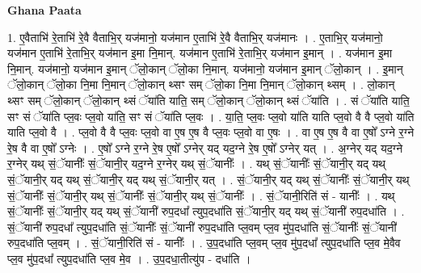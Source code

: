 \documentclass[17pt]{extarticle}
\begin{document}
\textbf{Ghana Paata } \newline

1. ए॒वैताभि॑ रे॒ताभि॑ रे॒वै वैताभि॒र् यज॑मानो॒ यज॑मान ए॒ताभि॑ रे॒वै वैताभि॒र् यज॑मानः । . ए॒ताभि॒र् यज॑मानो॒ यज॑मान ए॒ताभि॑ रे॒ताभि॒र् यज॑मान इ॒मा नि॒मान्. यज॑मान ए॒ताभि॑ रे॒ताभि॒र् यज॑मान इ॒मान् । . यज॑मान इ॒मा नि॒मान्. यज॑मानो॒ यज॑मान इ॒मान् ॅलो॒कान् ॅलो॒का नि॒मान्. यज॑मानो॒ यज॑मान इ॒मान् ॅलो॒कान् । . इ॒मान् ॅलो॒कान् ॅलो॒का नि॒मा नि॒मान् ॅलो॒कान् थ्सꣳ सम् ॅलो॒का नि॒मा नि॒मान् ॅलो॒कान् थ्सम् । . लो॒कान् थ्सꣳ सम् ॅलो॒कान् ॅलो॒कान् थ्सं ॅया॑ति याति॒ सम् ॅलो॒कान् ॅलो॒कान् थ्सं ॅया॑ति । . सं ॅया॑ति याति॒ सꣳ सं ॅया॑ति प्ल॒वः प्ल॒वो या॑ति॒ सꣳ सं ॅया॑ति प्ल॒वः । . या॒ति॒ प्ल॒वः प्ल॒वो या॑ति याति प्ल॒वो वै वै प्ल॒वो या॑ति याति प्ल॒वो वै । . प्ल॒वो वै वै प्ल॒वः प्ल॒वो वा ए॒ष ए॒ष वै प्ल॒वः प्ल॒वो वा ए॒षः । . वा ए॒ष ए॒ष वै वा ए॒षो᳚ ऽग्ने र॒ग्ने रे॒ष वै वा ए॒षो᳚ ऽग्नेः । . ए॒षो᳚ ऽग्ने र॒ग्ने रे॒ष ए॒षो᳚ ऽग्नेर् यद् यद॒ग्ने रे॒ष ए॒षो᳚ ऽग्नेर् यत् । . अ॒ग्नेर् यद् यद॒ग्ने र॒ग्नेर् यथ् सं॒ॅयानीः᳚ सं॒ॅयानी॒र् यद॒ग्ने र॒ग्नेर् यथ् सं॒ॅयानीः᳚ । . यथ् सं॒ॅयानीः᳚ सं॒ॅयानी॒र् यद् यथ् सं॒ॅयानी॒र् यद् यथ् सं॒ॅयानी॒र् यद् यथ् सं॒ॅयानी॒र् यत् । . सं॒ॅयानी॒र् यद् यथ् सं॒ॅयानीः᳚ सं॒ॅयानी॒र् यथ् सं॒ॅयानीः᳚ सं॒ॅयानी॒र् यथ् सं॒ॅयानीः᳚ सं॒ॅयानी॒र् यथ् सं॒ॅयानीः᳚ । . सं॒ॅयानी॒रिति॑ सं - यानीः᳚ । . यथ् सं॒ॅयानीः᳚ सं॒ॅयानी॒र् यद् यथ् सं॒ॅयानी॑ रुप॒दधा᳚ त्युप॒दधा॑ति सं॒ॅयानी॒र् यद् यथ् सं॒ॅयानी॑ रुप॒दधा॑ति । . सं॒ॅयानी॑ रुप॒दधा᳚ त्युप॒दधा॑ति सं॒ॅयानीः᳚ सं॒ॅयानी॑ रुप॒दधा॑ति प्ल॒वम् प्ल॒व मु॑प॒दधा॑ति सं॒ॅयानीः᳚ सं॒ॅयानी॑ रुप॒दधा॑ति प्ल॒वम् । . सं॒ॅयानी॒रिति॑ सं - यानीः᳚ । . उ॒प॒दधा॑ति प्ल॒वम् प्ल॒व मु॑प॒दधा᳚ त्युप॒दधा॑ति प्ल॒व मे॒वैव प्ल॒व मु॑प॒दधा᳚ त्युप॒दधा॑ति प्ल॒व मे॒व । . उ॒प॒दधा॒तीत्यु॑प - दधा॑ति । \newline
\end{document}

